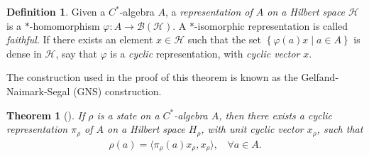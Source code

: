 \documentclass[11pt,a4paper]{report}
\theoremstyle{plain}
\newtheorem{thm}{Theorem}
\theoremstyle{definition}
\newtheorem{defn}{Definition}
\newcommand{\1}{\mathbbm{1}}
\renewcommand{\H}{\mathcal{H}}
\newcommand{\B}{\mathcal{B}}
\newcommand{\BH}{\mathcal{\B(\H)}}
\renewcommand{\phi}{\varphi}
\begin{document}
\begin{defn}
	Given a $C^\ast$-algebra $A$, a \emph{representation of $A$ on a Hilbert space 
	$\H$} is a $\ast$-homomorphism $\phi: A \to \BH$. A $\ast$-isomorphic 
	representation is called \emph{faithful}. If there exists an element $x\in\H$ 
	such that the set $\left\{\phi(a)x \mid a\in A\right\}$ is dense in $\H$, say 
	that $\phi$ is a \emph{cyclic} representation, with \emph{cyclic vector} $x$.

\end{defn}	
The construction used in the proof of this theorem is known as the 
Gelfand-Naimark-Segal (GNS) construction.
\begin{thm}[{\cite[4.5.2]{kadison83}}]\label{thm:gns}
	If $\rho$ is a state on a $C^\ast$-algebra $A$, then there exists a cyclic 
	representation $\pi_\rho$ of $A$ on a Hilbert space ${H}_\rho$, with unit cyclic 
	vector $x_\rho$, such that 
	\begin{align*} 
		\rho(a)= \langle \pi_\rho (a) x_\rho, x_\rho \rangle, ~~~~ \forall a \in A.
	\end{align*}
\end{thm}
\end{document}
